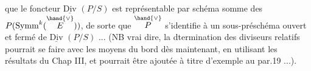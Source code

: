  que le foncteur $\underline{\mathrm{Div}}$ $(P/S)$ est représentable par schéma somme
des $P(\mathrm{Symm}^{k}(\overset{\hand{\vee}}{E}))$, de sorte que $\overset{\hand{\vee}}{P}$ s'identifie à un sous-préschéma ouvert
et fermé de $\underline{\mathrm{Div}}$ $(P/S)$ ... (NB  vrai dire, la dtermination des diviseurs
 relatifs pourrait se faire avec les moyens du bord dès maintenant, en
 utilisant les résultats du Chap III, et pourrait être ajoutée  à titre
 d'exemple au par.19 ...).

